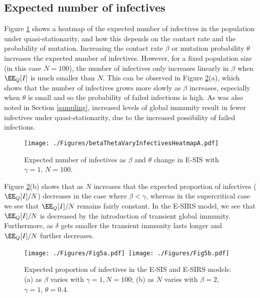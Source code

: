 \documentclass[review]{elsarticle}
\begin{document}
\subsection{Expected number of infectives}
Figure \ref{fig: bt sis} shows a heatmap of the expected number of infectives in the population under quasi-stationarity, and how this depends on the contact rate and the probability of mutation. Increasing the contact rate $\beta$ or mutation probability $\theta$ increases the expected number of infectives. However, for a fixed population size (in this case $N=100$), the number of infectives only increases linearly in $\beta$ when $\EE_Q[I]$ is much smaller than $N$. This can be observed in Figure \ref{fig: b sis}(a), which shows that the number of infectives grows more slowly as $\beta$ increases, especially when $\theta$ is small and so the probability of failed infections is high. As was also noted in Section \ref{sampling}, increased levels of global immunity result in fewer infectives under quasi-stationarity, due to the increased possibility of failed infections.

\begin{figure}
	\centering
	\texttt{[image: ./Figures/betaThetaVaryInfectivesHeatmapA.pdf]}
	\caption[Infectives as $\beta, \theta$ vary in the E-SIS Model.]{Expected number of infectives as $\beta$ and $\theta$ change in E-SIS with $\gamma = 1$, $N=100$.
}
	\label{fig: bt sis}
\end{figure}

Figure \ref{fig: b sis}(b) shows that as $N$ increases that the expected proportion of infectives ($\EE_Q[I]/N$) decreases in the case where $\beta < \gamma$, whereas in the supercritical case we see that $\EE_Q[I]/N$ remains fairly constant. In the E-SIRS model, we see that $\EE_Q[I]/N$ is decreased by the introduction of transient global immunity. Furthermore, as $\delta$ gets smaller the transient immunity lasts longer and $\EE_Q[I]/N$ further decreases. 

\begin{figure}
	\centering
 		\mbox{\texttt{[image: ./Figures/Fig5a.pdf]}
 		\texttt{[image: ./Figures/Fig5b.pdf]}}
	\caption{Expected proportion of infectives in the E-SIS and E-SIRS models: (a) as $\beta$ varies with $\gamma=1, N=100$; (b) as $N$ varies with $\beta = 2$, $\gamma = 1$, $\theta=0.4$.}
	\label{fig: b sis}
\end{figure}
\end{document}

